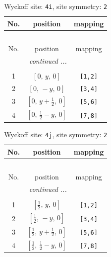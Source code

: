 \documentclass[fleqn,8pt]{jsarticle}
\begin{document}
\begin{longtable}{ccc}
\caption{Wyckoff site: {\tt 4i}, site symmetry: {\tt 2}}
 \\
 \hline \hline
No. & position & mapping \\ \hline \endfirsthead

\multicolumn{2}{l}{\tablename\ \thetable{}} \\
 \hline \hline
No. & position & mapping \\ \hline \endhead

 \hline \hline
\multicolumn{2}{r}{\footnotesize\it continued ...} \\ \endfoot

 \hline \hline
\multicolumn{2}{r}{} \\ \endlastfoot

1 & $\left[ 0,\, y,\, 0 \right]$ & {\tt [1,2]} \\ \hline
2 & $\left[ 0,\, - y,\, 0 \right]$ & {\tt [3,4]} \\ \hline
3 & $\left[ 0,\, y + \frac{1}{2},\, 0 \right]$ & {\tt [5,6]} \\ \hline
4 & $\left[ 0,\, \frac{1}{2} - y,\, 0 \right]$ & {\tt [7,8]} \\
\end{longtable}
\renewcommand{\arraystretch}{1.2}
\begin{longtable}{ccc}
\caption{Wyckoff site: {\tt 4j}, site symmetry: {\tt 2}}
 \\
 \hline \hline
No. & position & mapping \\ \hline \endfirsthead

\multicolumn{2}{l}{\tablename\ \thetable{}} \\
 \hline \hline
No. & position & mapping \\ \hline \endhead

 \hline \hline
\multicolumn{2}{r}{\footnotesize\it continued ...} \\ \endfoot

 \hline \hline
\multicolumn{2}{r}{} \\ \endlastfoot

1 & $\left[ \frac{1}{2},\, y,\, 0 \right]$ & {\tt [1,2]} \\ \hline
2 & $\left[ \frac{1}{2},\, - y,\, 0 \right]$ & {\tt [3,4]} \\ \hline
3 & $\left[ \frac{1}{2},\, y + \frac{1}{2},\, 0 \right]$ & {\tt [5,6]} \\ \hline
4 & $\left[ \frac{1}{2},\, \frac{1}{2} - y,\, 0 \right]$ & {\tt [7,8]} \\
\end{longtable}
\end{document}
